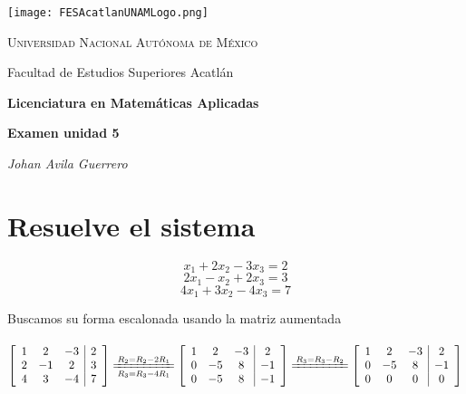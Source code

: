 \documentclass[a4paper,12pt]{article}
\begin{document}
\begin{titlepage}
    \centering
    \texttt{[image: FESAcatlanUNAMLogo.png]} %
    \vspace{1cm}
    
    {\scshape\large Universidad Nacional Autónoma de México \par}
    {\large Facultad de Estudios Superiores Acatlán \par}
    \vspace{1.5cm}
    
    {\Large\bfseries Licenciatura en Matemáticas Aplicadas \par}
    \vspace{2cm}
    
    {\Huge\bfseries Examen unidad 5 

    \par}
    \vspace{2cm}
    
    {\Large\itshape Johan Avila Guerrero \par}
    \vfill
    
    
    \vfill
    
\end{titlepage}



\section{Resuelve el sistema}
\[ x_1 + 2x_2 - 3x_3 = 2 \] 
\[ 2x_1 - x_2 + 2x_3 = 3 \] 
\[ 4x_1 + 3x_2 - 4x_3 = 7 \] 

Buscamos su forma escalonada usando la matriz aumentada \\ \\

    \( 
        \left[\begin{array}{ccc|c}
        1 & 2 & -3 & 2 \\
        2 & -1 & 2 & 3 \\
        4 & 3 & -4 & 7 
        \end{array}\right] 
        \xlongequal[R_3=R_3-4R_1]{R_2=R_2 - 2R_1}
        \left[\begin{array}{ccc|c}
        1 & 2 & -3 & 2 \\
        0 & -5 & 8 & -1 \\
        0 & -5 & 8 & -1 
        \end{array}\right] 
        \xlongequal[]{R_3=R_3 - R_2}
        \left[\begin{array}{ccc|c}
        1 & 2 & -3 & 2 \\
        0 & -5 & 8 & -1 \\
        0 & 0 & 0 & 0 
        \end{array}\right]
    \) \\ \\
\end{document}
